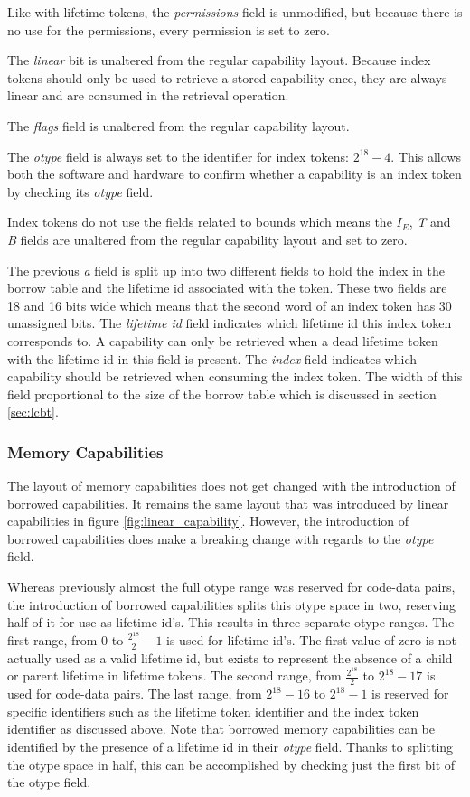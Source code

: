 Like with lifetime tokens, the \textit{permissions} field is unmodified, but because there is no use for the permissions, every permission is set to zero.

The \textit{linear} bit is unaltered from the regular capability layout. Because index tokens should only be used to retrieve a stored capability once, they are always linear and are consumed in the retrieval operation.

The \textit{flags} field is unaltered from the regular capability layout.

The \textit{otype} field is always set to the identifier for index tokens: $2^{18} - 4$. This allows both the software and hardware to confirm whether a capability is an index token by checking its \textit{otype} field.

Index tokens do not use the fields related to bounds which means the $I_E$, \textit{T} and \textit{B} fields are unaltered from the regular capability layout and set to zero.

The previous \textit{a} field is split up into two different fields to hold the index in the borrow table and the lifetime id associated with the token. These two fields are 18 and 16 bits wide which means that the second word of an index token has 30 unassigned bits. The \textit{lifetime id} field indicates which lifetime id this index token corresponds to. A capability can only be retrieved when a dead lifetime token with the lifetime id in this field is present. The \textit{index} field indicates which capability should be retrieved when consuming the index token. The width of this field proportional to the size of the borrow table which is discussed in section \ref{sec:lcbt}.

\subsubsection{Memory Capabilities}
The layout of memory capabilities does not get changed with the introduction of borrowed capabilities. It remains the same layout that was introduced by linear capabilities in figure \ref{fig:linear_capability}. However, the introduction of borrowed capabilities does make a breaking change with regards to the \textit{otype} field.

Whereas previously almost the full otype range was reserved for code-data pairs, the introduction of borrowed capabilities splits this otype space in two, reserving half of it for use as lifetime id's. This results in three separate otype ranges. The first range, from 0 to $\frac{2^{18}}{2} - 1$ is used for lifetime id's. The first value of zero is not actually used as a valid lifetime id, but exists to represent the absence of a child or parent lifetime in lifetime tokens. The second range, from  $\frac{2^{18}}{2}$ to $2^{18} - 17$ is used for code-data pairs. The last range, from $2^{18} - 16$ to $2^{18} - 1$ is reserved for specific identifiers such as the lifetime token identifier and the index token identifier as discussed above. Note that borrowed memory capabilities can be identified by the presence of a lifetime id in their \textit{otype} field. Thanks to splitting the otype space in half, this can be accomplished by checking just the first bit of the otype field.

